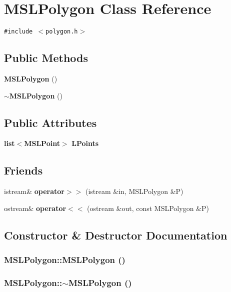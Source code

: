 \section{MSLPolygon  Class Reference}
\label{classMSLPolygon}
{\tt \#include $<$polygon.h$>$}

\subsection*{Public Methods}
\begin{CompactItemize}
\item 
{\bf MSLPolygon} ()
\item 
{\bf $\sim$MSLPolygon} ()
\end{CompactItemize}
\subsection*{Public Attributes}
\begin{CompactItemize}
\item 
{\bf list}$<${\bf MSLPoint}$>$ {\bf LPoints}
\end{CompactItemize}
\subsection*{Friends}
\begin{CompactItemize}
\item 
istream\& {\bf operator$>$$>$} (istream \&in, MSLPolygon \&P)
\item 
ostream\& {\bf operator$<$$<$} (ostream \&out, const MSLPolygon \&P)
\end{CompactItemize}


\subsection{Constructor \& Destructor Documentation}
\subsubsection{\setlength{\rightskip}{0pt plus 5cm}MSLPolygon::MSLPolygon ()\hspace{0.3cm}{\tt  [inline]}}\label{classMSLPolygon_a0}


\subsubsection{\setlength{\rightskip}{0pt plus 5cm}MSLPolygon::$\sim$MSLPolygon ()\hspace{0.3cm}{\tt  [inline]}}\label{classMSLPolygon_a1}




